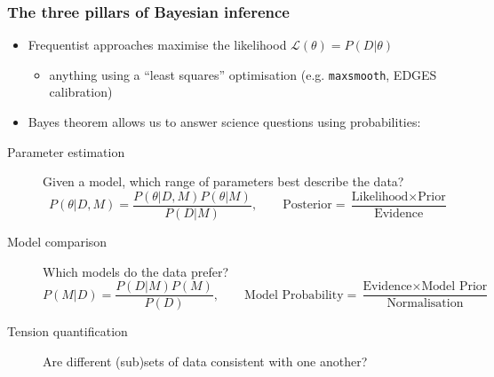 \documentclass[aspectratio=169]{beamer}
\begin{document}
\begin{frame}
    \frametitle{The three pillars of Bayesian inference}
    \begin{itemize}
        \item Frequentist approaches maximise the likelihood $\mathcal{L}(\theta) = P(D|\theta)$
            \begin{itemize}
                \item anything using a ``least squares'' optimisation (e.g. \texttt{maxsmooth}, EDGES calibration)
            \end{itemize}
        \item Bayes theorem allows us to answer science questions using probabilities:
    \end{itemize}
    \begin{description}
        \item[Parameter estimation] Given a model, which range of parameters best describe the data?
            \[
                P(\theta|D,M) = \frac{P(\theta|D,M) P(\theta|M)}{P(D|M)}, \qquad
                \text{Posterior} = \frac{\text{Likelihood} \times \text{Prior}}{\text{Evidence}}
            \]
        \item[Model comparison] Which models do the data prefer?
            \[
                P(M|D) = \frac{P(D|M) P(M)}{P(D)}, \qquad
                \text{Model Probability} = \frac{\text{Evidence} \times \text{Model Prior}}{\text{Normalisation}}
            \]
        \item[Tension quantification] Are different (sub)sets of data consistent with one another? %
    \end{description}
\end{frame}
\end{document}

